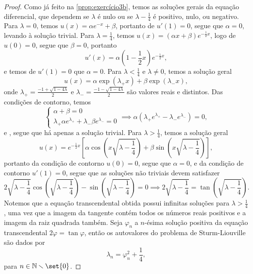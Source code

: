 \begin{proof}
    Como já feito na \cref{prop:exercício3b}, temos as soluções gerais da equação diferencial, que dependem se \(\lambda\) é nulo ou se \(\lambda - \frac14\) é positivo, nulo, ou negativo. Para \(\lambda = 0\), temos \(u(x) = \alpha e^{-x} + \beta\), portanto de \(u'(1) = 0\), segue que \(\alpha = 0\), levando à solução trivial. Para \(\lambda = \frac14\), temos \(u(x) = (\alpha x + \beta)e^{-\frac12 x}\), logo de \(u(0) = 0\), segue que \(\beta = 0\), portanto
    \begin{equation*}
        u'(x) = \alpha \left(1 - \frac12 x\right)e^{-\frac12 x},
    \end{equation*}
    e temos de \(u'(1) = 0\) que \(\alpha = 0\). Para \(\lambda < \frac14\) e \(\lambda \neq 0\), temos a solução geral
    \begin{equation*}
        u(x) = \alpha \exp\left(\lambda_+ x\right) + \beta \exp\left(\lambda_-x\right),
    \end{equation*}
    onde \(\lambda_+ = \frac{-1 + \sqrt{1 - 4 \lambda}}{2}\) e \(\lambda_- = \frac{-1 - \sqrt{1 - 4 \lambda}}{2}\) são valores reais e distintos. Das condições de contorno, temos
    \begin{equation*}
        \begin{cases}
            \alpha + \beta = 0\\
            \lambda_+ \alpha e^{\lambda_+} + \lambda_- \beta e^{\lambda_-} = 0
        \end{cases} \implies
        \alpha (\lambda_+ e^{\lambda_+} - \lambda_- e^{\lambda_-}) = 0,
    \end{equation*}
    e , segue que há apenas a solução trivial. Para \(\lambda > \frac14\), temos a solução geral
    \begin{equation*}
        u(x) = e^{-\frac12x}\left[\alpha \cos\left(x\sqrt{\lambda - \frac14}\right) + \beta \sin\left(x\sqrt{\lambda - \frac14}\right)\right],
    \end{equation*}
    portanto da condição de contorno \(u(0) = 0\), segue que \(\alpha = 0\), e da condição de contorno \(u'(1) = 0\), segue que as soluções não triviais devem satisfazer
    \begin{equation*}
        2 \sqrt{\lambda - \frac14}\cos\left(\sqrt{\lambda - \frac14}\right) - \sin\left(\sqrt{\lambda - \frac14}\right) = 0 \implies 2\sqrt{\lambda - \frac14} = \tan\left(\sqrt{\lambda - \frac14}\right).
    \end{equation*}
    Notemos que a equação transcendental obtida possui infinitas soluções para \(\lambda > \frac14\), uma vez que a imagem da tangente contém todos os números reais positivos e a imagem da raiz quadrada também. Seja \(\varphi_n\) a \(n\)-ésima solução positiva da equação transcendental \(2\varphi = \tan \varphi\), então os autovalores do problema de Sturm-Liouville são dados por
    \begin{equation*}
        \lambda_n = \varphi_n^2 + \frac14,
    \end{equation*}
    para \(n \in \mathbb{N} \smallsetminus\set{0}\).


\end{proof}
